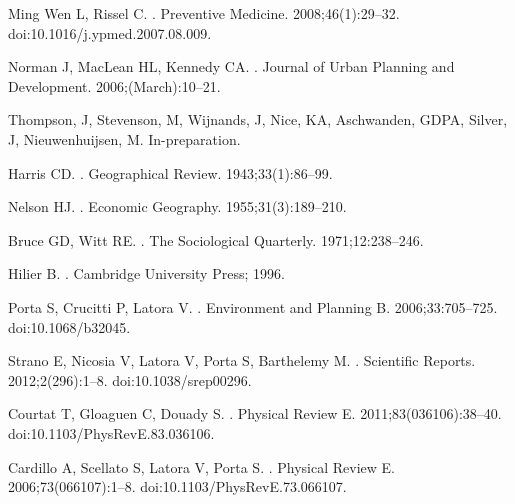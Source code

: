 {Ming Wen} L, Rissel C.
.
\newblock Preventive Medicine. 2008;46(1):29--32.
\newblock doi:{10.1016/j.ypmed.2007.08.009}.

Norman J, MacLean HL, Kennedy CA.
.
\newblock Journal of Urban Planning and Development. 2006;(March):10--21.

Thompson, J, Stevenson, M, Wijnands, J, Nice, KA, Aschwanden, GDPA, Silver, J, Nieuwenhuijsen, M.
\newblock In-preparation.

Harris CD.
.
\newblock Geographical Review. 1943;33(1):86--99.

Nelson HJ.
.
\newblock Economic Geography. 1955;31(3):189--210.

Bruce GD, Witt RE.
.
\newblock The Sociological Quarterly. 1971;12:238--246.

Hilier B.
.
\newblock Cambridge University Press; 1996.

Porta S, Crucitti P, Latora V.
.
\newblock Environment and Planning B. 2006;33:705--725.
\newblock doi:{10.1068/b32045}.

Strano E, Nicosia V, Latora V, Porta S, Barthelemy M.
.
\newblock Scientific Reports. 2012;2(296):1--8.
\newblock doi:{10.1038/srep00296}.

Courtat T, Gloaguen C, Douady S.
.
\newblock Physical Review E. 2011;83(036106):38--40.
\newblock doi:{10.1103/PhysRevE.83.036106}.

Cardillo A, Scellato S, Latora V, Porta S.
.
\newblock Physical Review E. 2006;73(066107):1--8.
\newblock doi:{10.1103/PhysRevE.73.066107}.


